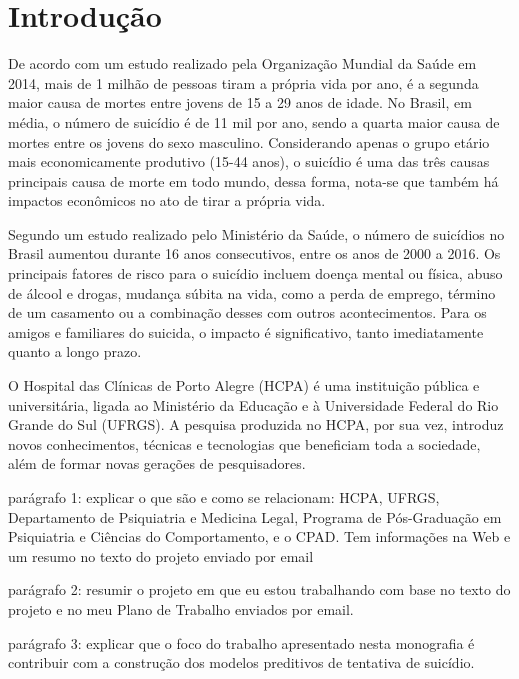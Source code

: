 \chapter{Introdução}
\label{cap:introducao}

De acordo com um estudo realizado pela Organização Mundial da Saúde em 2014, mais de 1 milhão de pessoas tiram a própria vida por ano, é a segunda maior causa de mortes entre jovens de 15 a 29 anos de idade. No Brasil, em média, o número de suicídio é de 11 mil por ano, sendo a quarta maior causa de mortes entre os jovens do sexo masculino. Considerando apenas o grupo etário mais economicamente produtivo (15-44 anos), o suicídio é uma das três causas principais causa de morte em todo mundo, dessa forma, nota-se que também há impactos econômicos no ato de tirar a própria vida. 

Segundo um estudo realizado pelo Ministério da Saúde, o número de suicídios no Brasil aumentou durante 16 anos consecutivos, entre os anos de 2000 a 2016. Os principais fatores de risco para o suicídio incluem doença mental ou física, abuso de álcool e drogas, mudança súbita na vida, como a perda de emprego, término de um casamento ou a combinação desses com outros acontecimentos. Para os amigos e familiares do suicida, o impacto é significativo, tanto imediatamente quanto a longo prazo. 

O Hospital das Clínicas de Porto Alegre (HCPA) é uma instituição pública e universitária, ligada ao Ministério da Educação e à Universidade Federal do Rio Grande do Sul (UFRGS).
A pesquisa produzida no HCPA, por sua vez, introduz novos conhecimentos, técnicas e tecnologias que beneficiam toda a sociedade, além de formar novas gerações de pesquisadores.

parágrafo 1: explicar o que são e como se relacionam: HCPA, UFRGS, Departamento de Psiquiatria e Medicina Legal, Programa de Pós-Graduação em Psiquiatria e Ciências do Comportamento, e o CPAD. Tem informações na Web e um resumo no texto do projeto enviado por email

parágrafo 2: resumir o projeto em que eu estou trabalhando com base no texto do projeto e no meu Plano de Trabalho enviados por email.

parágrafo 3: explicar que o foco do trabalho apresentado nesta monografia é contribuir com a construção dos modelos preditivos de tentativa de suicídio.


